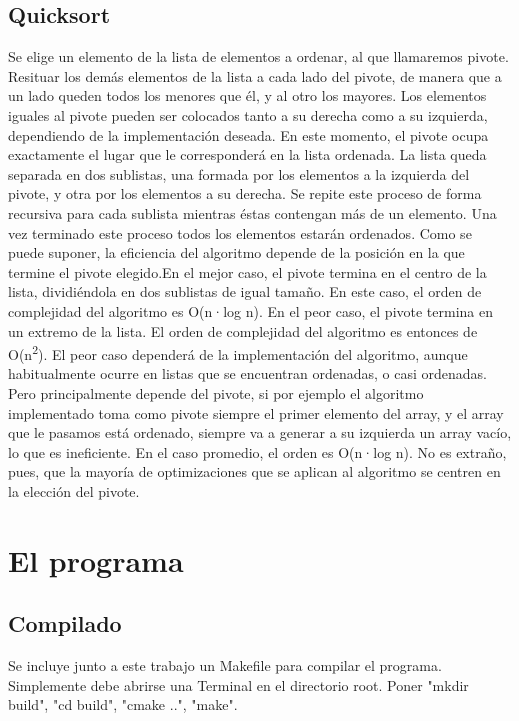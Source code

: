 \documentclass[a4paper,10pt]{article}
\begin{document}
\subsection{Quicksort}
 Se elige un elemento de la lista de elementos a ordenar, al que llamaremos pivote. Resituar los dem\'as elementos de la lista a cada lado del pivote, de manera que a un lado queden todos los menores que \'el, y al otro los mayores. Los elementos iguales al pivote pueden ser colocados tanto a su derecha como a su izquierda, dependiendo de la implementación deseada. En este momento, el pivote ocupa exactamente el lugar que le corresponderá en la lista ordenada. La lista queda separada en dos sublistas, una formada por los elementos a la izquierda del pivote, y otra por los elementos a su derecha. Se repite este proceso de forma recursiva para cada sublista mientras \'estas contengan m\'as de un elemento. Una vez terminado este proceso todos los elementos estar\'an ordenados. Como se puede suponer, la eficiencia del algoritmo depende de la posición en la que termine el pivote elegido.En el mejor caso, el pivote termina en el centro de la lista, dividi\'endola en dos sublistas de igual tamaño. En este caso, el orden de complejidad del algoritmo es O(n·log n). En el peor caso, el pivote termina en un extremo de la lista. El orden de complejidad del algoritmo es entonces de O(n\textsuperscript{2}). El peor caso dependerá de la implementación del algoritmo, aunque habitualmente ocurre en listas que se encuentran ordenadas, o casi ordenadas. Pero principalmente depende del pivote, si por ejemplo el algoritmo implementado toma como pivote siempre el primer elemento del array, y el array que le pasamos est\'a ordenado, siempre va a generar a su izquierda un array vac\'io, lo que es ineficiente. En el caso promedio, el orden es O(n·log n). No es extraño, pues, que la mayor\'ia de optimizaciones que se aplican al algoritmo se centren en la elecci\'on del pivote.



\newpage
\section{El programa}

\subsection{Compilado}
Se incluye junto a este trabajo un Makefile para compilar el programa. Simplemente debe abrirse una Terminal en el directorio root. Poner "mkdir build", "cd build", "cmake ..", "make".
\end{document}
